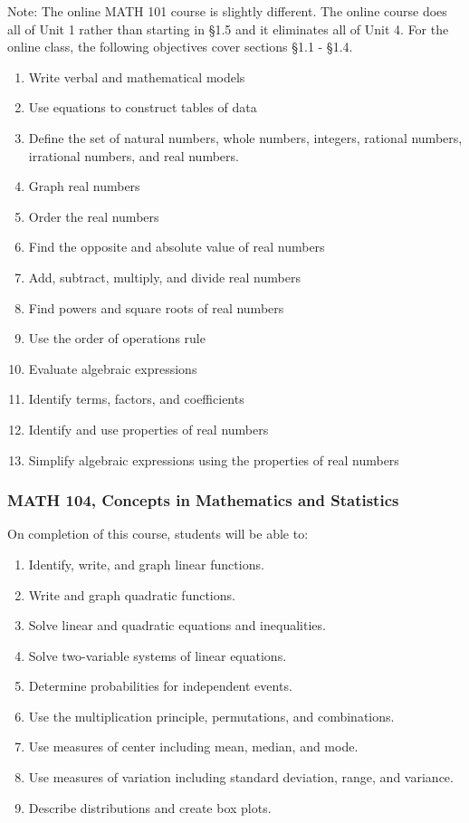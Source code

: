 \documentclass[11pt]{article}
\newenvironment{alphalist}{
\begin{enumerate}[label=(\arabic*),widest=107 ,leftmargin=25pt, itemsep=0pt]}
{\end{enumerate}}
\begin{document}
\noindent Note: The online MATH  101 course is slightly different. The online course does all of Unit 1 rather than starting in \S 1.5 and
it eliminates all of Unit 4.  For the online class, the following objectives cover sections \S 1.1 - \S 1.4.
 
\begin{alphalist}
    \item Write verbal and mathematical models
    \item Use equations to construct tables of data
    \item Define the set of natural numbers, whole numbers, integers, rational numbers, irrational numbers, and real numbers.
    \item Graph real numbers
    \item Order the real numbers
    \item Find the opposite and absolute value of real numbers
    \item Add, subtract, multiply, and divide real numbers
    \item Find powers and square roots of real numbers
    \item Use the order of operations rule
    \item Evaluate algebraic expressions
    \item Identify terms, factors, and coefficients
    \item Identify and use properties of real numbers
    \item Simplify algebraic expressions using the properties of real numbers

\end{alphalist}



\subsubsection*{MATH 104,  Concepts in Mathematics and Statistics}


On completion of this course, students will be able to:
\begin{alphalist}
    \item Identify, write, and graph linear functions.
    \item Write and graph quadratic functions.
    \item Solve linear and quadratic equations and inequalities.
    \item Solve two-variable systems of linear equations.
    \item Determine probabilities for independent events.
    \item Use the multiplication principle, permutations, and combinations.
    \item Use measures of center including mean, median, and mode.
    \item Use measures of variation including standard deviation, range, and variance.
    \item Describe distributions and create box plots.
\end{alphalist}
\end{document}
